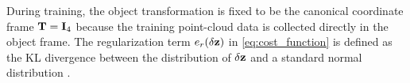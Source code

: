 During training, the object transformation is fixed to be the canonical coordinate frame $\mathbf{T} = \mathbf{I}_4$ because the training point-cloud data is collected directly in the object frame. The regularization term $e_r(\delta\mathbf{z})$ in \eqref{eq:cost_function} is defined as the KL divergence between the distribution of $\delta\mathbf{z}$ and a standard normal distribution \cite{hao2020dualsdf}.












